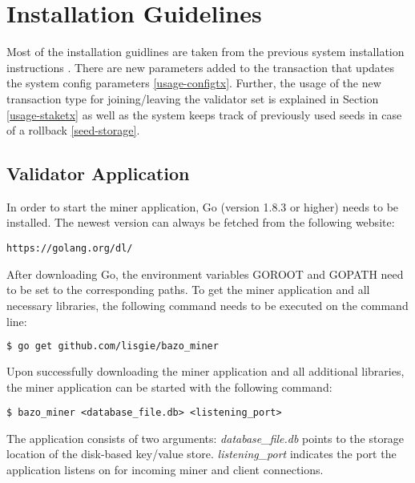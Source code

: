 \appendix

\chapter{Installation Guidelines}

\lstset{
	frame = single, 
	language=bash, 
	framexleftmargin=5pt,
	framextopmargin=5pt,
	framexbottommargin=5pt,
}

Most of the installation guidlines are taken from the previous system installation instructions \cite{bazo_paper}. There are new parameters added to the transaction that updates the system config parameters \ref{usage-configtx}. Further, the usage of the new transaction type for joining/leaving the validator set is explained in Section \ref{usage-staketx} as well as the system keeps track of previously used seeds in case of a rollback \ref{seed-storage}.

\section{Validator Application}
In order to start the miner application, Go (version 1.8.3 or higher) needs to be installed. The newest version can always be fetched from the following website:

\begin{lstlisting}
https://golang.org/dl/
\end{lstlisting}

After downloading Go, the environment variables GOROOT and GOPATH need to be set to the corresponding paths.
To get the miner application and all necessary libraries, the following command needs to be executed on the command line:
\begin{lstlisting}[language=bash]
$ go get github.com/lisgie/bazo_miner
\end{lstlisting}

Upon successfully downloading the miner application and all additional libraries, the miner application can be started with the following command:
\begin{lstlisting}
$ bazo_miner <database_file.db> <listening_port>
\end{lstlisting}

The application consists of two arguments: \textit{database\_file.db} points to the storage location of the disk-based key/value store. \textit{listening\_port} indicates the port the application listens on for incoming miner and client connections.

